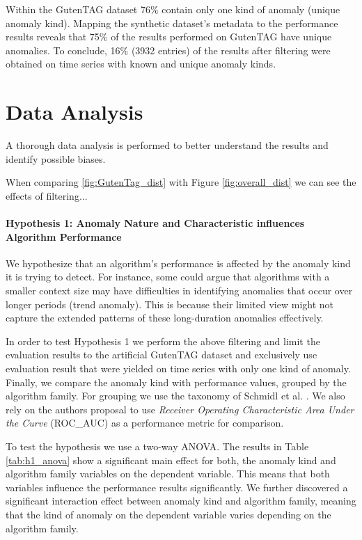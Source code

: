 Within the GutenTAG dataset 76\% contain only one kind of anomaly (unique anomaly kind). Mapping the synthetic dataset's metadata to the performance results reveals that 75\% of the results performed on GutenTAG have unique anomalies. 
To conclude, 16\% (3932 entries) of the results after filtering were obtained on time series with known and unique anomaly kinds.

\section{Data Analysis}
A thorough data analysis is performed to better understand the results and identify possible biases.



When comparing \ref{fig:GutenTag_dist} with Figure \ref{fig:overall_dist} we can see the effects of filtering... 

\paragraph{Hypothesis 1: Anomaly Nature and Characteristic influences Algorithm Performance} 
We hypothesize that an algorithm's performance is affected by the anomaly kind it is trying to detect. For instance, some could argue that algorithms with a smaller context size may have difficulties in identifying anomalies that occur over longer periods (trend anomaly). This is because their limited view might not capture the extended patterns of these long-duration anomalies effectively.

In order to test Hypothesis 1 we perform the above filtering and limit the evaluation results to the artificial GutenTAG dataset and exclusively use evaluation result that were yielded on time series with only one kind of anomaly. Finally, we compare the anomaly kind with performance values, grouped by the algorithm family. For grouping we use the taxonomy of Schmidl et al. \cite{Schmidl2022}. We also rely on the authors proposal to use \textit{Receiver Operating Characteristic Area Under the Curve} (ROC\_AUC) as a performance metric for comparison.

To test the hypothesis we use a two-way ANOVA. The results in Table \ref{tab:h1_anova} show a significant main effect for both, the anomaly kind and algorithm family variables on the dependent variable. This means that both variables influence the performance results significantly. We further discovered a significant interaction effect between anomaly kind and algorithm family, meaning that the kind of anomaly on the dependent variable varies depending on the algorithm family.

